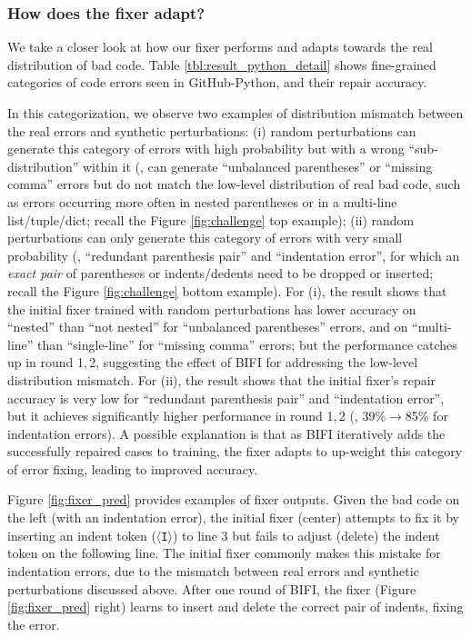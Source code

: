 \subsubsection{How does the fixer adapt?}
\label{sec:analysis-adapt}

We take a closer look at how our fixer performs and adapts towards the real distribution of bad code. Table \ref{tbl:result_python_detail} shows fine-grained categories of code errors seen in GitHub-Python, and their repair accuracy.

In this categorization, we observe two examples of distribution mismatch between the real errors and synthetic perturbations: (i) random perturbations can generate this category of errors with high probability but with a wrong ``sub-distribution'' within it (\eg, can generate ``unbalanced parentheses'' or ``missing comma'' errors but do not match the low-level distribution of real bad code, such as errors occurring more often in nested parentheses or in a multi-line list/tuple/dict; recall the Figure \ref{fig:challenge} top example); 
(ii) random perturbations can only generate this category of errors with very small probability (\eg, ``redundant parenthesis pair'' and ``indentation error'', for which an \textit{exact pair} of parentheses or indents/dedents need to be dropped or inserted; recall the Figure \ref{fig:challenge} bottom example).
For (i), the result shows that the initial fixer trained with random perturbations has lower accuracy on ``nested'' than ``not nested'' for ``unbalanced parentheses'' errors, and on ``multi-line'' than ``single-line'' for ``missing comma'' errors; but the performance catches up in round 1,\,2, suggesting the effect of BIFI for addressing the low-level distribution mismatch.
For (ii), the result shows that the initial fixer's repair accuracy is very low for ``redundant parenthesis pair'' and ``indentation error'', but it achieves significantly higher performance in round 1,\,2 (\eg, 39\%$\rightarrow$85\% for indentation errors). A possible explanation is that as BIFI iteratively adds the successfully repaired cases to training, the fixer adapts to up-weight this category of error fixing, leading to improved accuracy.

 
Figure \ref{fig:fixer_pred} provides examples of fixer outputs. Given the bad code on the left (with an indentation error), the initial fixer (center) attempts to fix it by inserting an indent token (\texttt{$\langle$I$\rangle$}) to line 3 but fails to adjust (delete) the indent token on the following line. The initial fixer commonly makes this mistake for indentation errors, due to the mismatch between real errors and synthetic perturbations discussed above. After one round of BIFI, the fixer (Figure \ref{fig:fixer_pred} right) learns to insert and delete the correct pair of indents, fixing the error.
